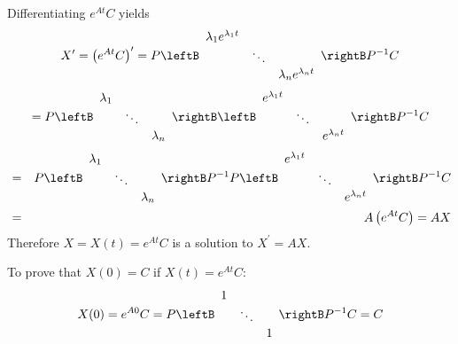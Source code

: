 Differentiating $e^{At}C$ yields
\begin{equation*}
X^{\prime} = \left( e^{At}C\right) ^{\prime }=P\leftB 
\begin{array}{ccc}
\lambda _{1}e^{\lambda _{1}t} &  &  \\ 
& \ddots &  \\ 
&  & \lambda _{n}e^{\lambda _{n}t}
\end{array}
\rightB P^{-1}C
\end{equation*}
\begin{equation*}
=P\leftB 
\begin{array}{ccc}
\lambda _{1} &  &  \\ 
& \ddots &  \\ 
&  & \lambda _{n}
\end{array}
\rightB \leftB 
\begin{array}{ccc}
e^{\lambda _{1}t} &  &  \\ 
& \ddots &  \\ 
&  & e^{\lambda _{n}t}
\end{array}
\rightB P^{-1}C
\end{equation*}
\begin{eqnarray*}
&=&P\leftB 
\begin{array}{ccc}
\lambda _{1} &  &  \\ 
& \ddots &  \\ 
&  & \lambda _{n}
\end{array}
\rightB P^{-1}P\leftB 
\begin{array}{ccc}
e^{\lambda _{1}t} &  &  \\ 
& \ddots &  \\ 
&  & e^{\lambda _{n}t}
\end{array}
\rightB P^{-1}C \\
&=&A\left( e^{At}C\right) = AX
\end{eqnarray*}
Therefore $X = X(t) = e^{At}C$ is a solution to $X^{\prime }=AX$. 

To prove that $X(0) =  C$ if $X(t) = e^{At}C$:
\begin{equation*}
X(0) = e^{A0}C=P\leftB 
\begin{array}{ccc}
1 &  &  \\ 
& \ddots &  \\ 
&  & 1
\end{array}
\rightB P^{-1}C=C
\end{equation*}

